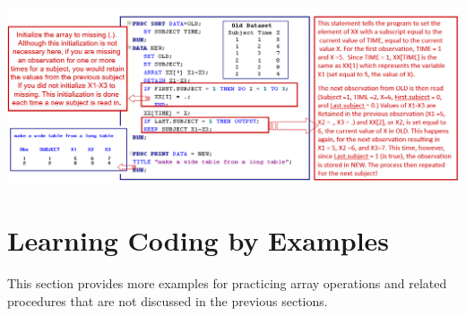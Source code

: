 \documentclass[
]{book}
\begin{document}
\begin{center}\includegraphics[width=1\linewidth]{img11/w11-reshapeTableAnnotatedCode} \end{center}

\hypertarget{learning-coding-by-examples-7}{%
\section{Learning Coding by Examples}\label{learning-coding-by-examples-7}}

This section provides more examples for practicing array operations and related procedures that are not discussed in the previous sections.
\end{document}
